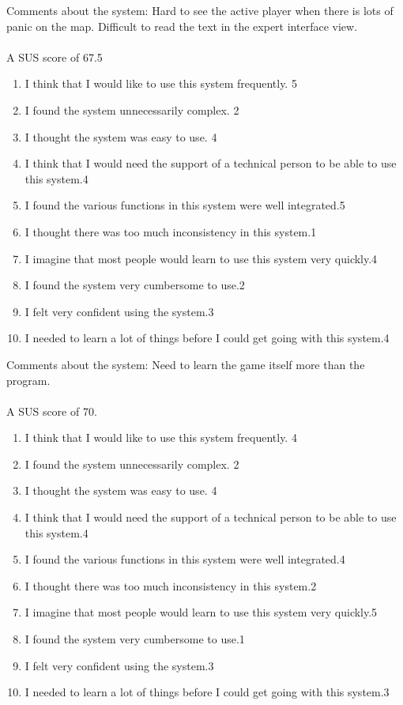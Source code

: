 Comments about the system: Hard to see the active player when there is lots of panic on the map. Difficult to read the text in the expert interface view.\\

\\A SUS score of 67.5\\

\begin{enumerate} \setlength{\itemsep}{0cm}\setlength{\parskip}{0cm}
	\item I think that I would like to use this system frequently. \hfill 5 
	\item I found the system unnecessarily complex. \hfill 2
	\item I thought the system was easy to use. \hfill 4
	\item I think that I would need the support of a technical person to be able to use this system.\hfill 4
	\item I found the various functions in this system were well integrated.\hfill 5
	\item I thought there was too much inconsistency in this system.\hfill 1
	\item I imagine that most people would learn to use this system very quickly.\hfill 4
	\item I found the system very cumbersome to use.\hfill 2
	\item I felt very confident using the system.\hfill 3
	\item I needed to learn a lot of things before I could get going with this system.\hfill 4
\end{enumerate}

Comments about the system: Need to learn the game itself more than the program.\\

\\A SUS score of 70.\\

\begin{enumerate} \setlength{\itemsep}{0cm}\setlength{\parskip}{0cm}
	\item I think that I would like to use this system frequently. \hfill 4
	\item I found the system unnecessarily complex. \hfill 2
	\item I thought the system was easy to use. \hfill 4
	\item I think that I would need the support of a technical person to be able to use this system.\hfill 4
	\item I found the various functions in this system were well integrated.\hfill 4
	\item I thought there was too much inconsistency in this system.\hfill 2
	\item I imagine that most people would learn to use this system very quickly.\hfill 5
	\item I found the system very cumbersome to use.\hfill 1
	\item I felt very confident using the system.\hfill 3
	\item I needed to learn a lot of things before I could get going with this system.\hfill 3
\end{enumerate}

